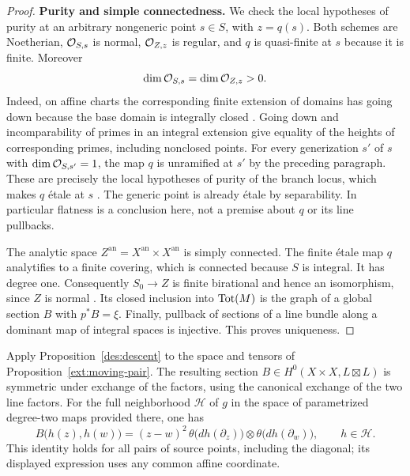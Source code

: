 \begin{proof}
\medskip
\noindent\textbf{Purity and simple connectedness.}
We check the local hypotheses of purity at an arbitrary nongeneric
point $s\in S$, with $z=q(s)$. Both schemes are Noetherian,
$\mathcal O_{S,s}$ is normal, $\mathcal O_{Z,z}$ is regular, and $q$ is
quasi-finite at $s$ because it is finite. Moreover
\[
\dim\mathcal O_{S,s}=\dim\mathcal O_{Z,z}>0.
\]
Indeed, on affine charts the corresponding finite extension of
domains has going down because the base domain is integrally closed
\cite[Proposition 10.38.7, Tag ]{Stacks}.
Going down and incomparability of primes in an integral extension
give equality of the heights of corresponding primes, including
nonclosed points. For every generization $s'$ of $s$ with
$\dim\mathcal O_{S,s'}=1$, the map $q$ is unramified at $s'$ by the
preceding paragraph. These are precisely the local hypotheses of
purity of the branch locus, which makes $q$ \'etale at $s$
\cite[Lemma 58.21.4, Tag ]{Stacks}. The generic point
is already \'etale by separability. In particular flatness is a
conclusion here, not a premise about $q$ or its line pullbacks.

The analytic space $Z^{\mathrm{an}}=X^{\mathrm{an}}\times
X^{\mathrm{an}}$ is simply connected. The finite \'etale map $q$
analytifies to a finite covering, which is connected because $S$ is
integral. It has degree one. Consequently $S_0\to Z$ is finite
birational and hence an isomorphism, since $Z$ is normal
\cite[Lemma 29.55.8, Tag ]{Stacks}. Its closed inclusion into
$\operatorname{Tot}(M)$ is the graph of a global section $B$ with $p^*B=\xi$.
Finally, pullback of sections of a line bundle along a dominant map
of integral spaces is injective. This proves uniqueness.
\end{proof}

\begin{corollary}
\label{des:family}
Apply Proposition~\ref{des:descent} to the space and tensors of
Proposition~\ref{ext:moving-pair}. The resulting section
$B\in H^0(X\times X,L\boxtimes L)$ is symmetric under exchange of
the factors, using the canonical exchange of the two line factors.
For the full neighborhood $\mathcal H$ of $g$ in the space of
parametrized degree-two maps provided there, one has
\begin{equation}\label{des:family-identity}
B\bigl(h(z),h(w)\bigr)
=(z-w)^2\,\theta\bigl(dh(\partial_z)\bigr)
       \otimes\theta\bigl(dh(\partial_w)\bigr),
\qquad h\in\mathcal H.
\end{equation}
This identity holds for all pairs of source points, including the
diagonal; its displayed expression uses any common affine coordinate.
\end{corollary}

